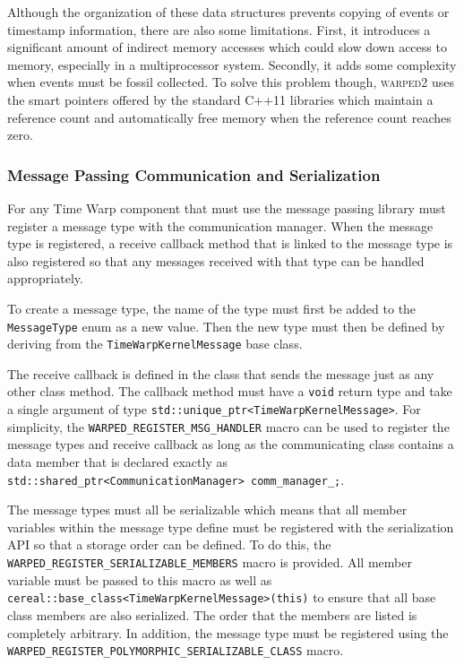 \documentclass[11pt]{book}
\begin{document}
Although the organization of these data structures prevents copying of events or timestamp
information, there are also some limitations.  First, it introduces a significant amount of indirect
memory accesses which could slow down access to memory, especially in a multiprocessor system.
Secondly, it adds some complexity when events must be fossil collected.  To solve this problem
though, \textsc{warped2} uses the smart pointers offered by the standard C++11 libraries which
maintain a reference count and automatically free memory when the reference count reaches zero.

\subsubsection{Message Passing Communication and Serialization}

For any Time Warp component that must use the message passing library must register a message type
with the communication manager.  When the message type is registered, a receive callback method that
is linked to the message type is also registered so that any messages received with that type can be
handled appropriately.

To create a message type, the name of the type must first be added to the \texttt{MessageType} enum
as a new value.  Then the new type must then be defined by deriving from the
\texttt{TimeWarpKernelMessage} base class.

The receive callback is defined in the class that sends the message just as any other class method.
The callback method must have a \texttt{void} return type and take a single argument of type
\texttt{std::unique\_ptr<TimeWarpKernelMessage>}.  For simplicity, the
\texttt{WARPED\_REGISTER\_MSG\_HANDLER} macro can be used to register the message types and receive
callback as long as the communicating class contains a data member that is declared exactly as
\texttt{std::shared\_ptr<CommunicationManager> comm\_manager\_;}.

The message types must all be serializable which means that all member variables within the message
type define must be registered with the serialization API so that a storage order can be defined.
To do this, the \texttt{WARPED\_REGISTER\_SERIALIZABLE\_MEMBERS} macro is provided.  All member
variable must be passed to this macro as well as
\texttt{cereal::base\_class<TimeWarpKernelMessage>(this)} to ensure that all base class members are
also serialized.  The order that the members are listed is completely arbitrary.  In addition, the
message type must be registered using the
\texttt{WARPED\_REGISTER\_POLYMORPHIC\_SERIALIZABLE\_CLASS} macro.
\end{document}
